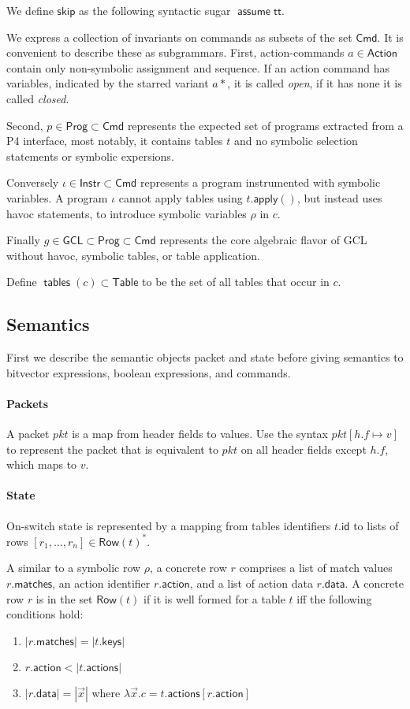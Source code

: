 \documentclass{article}
\newcommand{\pkt}{\mathit{pkt}}
\newcommand{\TRUE}{\mathsf{tt}}
\newcommand{\Cmd}{\mathsf{Cmd}}
\newcommand{\Action}{\mathsf{Action}}
\newcommand{\Instr}{\mathsf{Instr}}
\newcommand{\Prog}{\mathsf{Prog}}
\newcommand{\GCL}{\mathsf{GCL}}
\newcommand{\Table}{\mathsf{Table}}
\newcommand{\Row}{\mathsf{Row}}
\newcommand{\matches}{\mathsf{matches}}
\newcommand{\action}{\mathsf{action}}
\newcommand{\actions}{\mathsf{actions}}
\newcommand{\keys}{\mathsf{keys}}
\newcommand{\data}{\mathsf{data}}
\newcommand{\id}{\mathsf{id}}
\newcommand{\assume}{\mathop{\mathsf{assume}}}
\newcommand{\apply}{\mathsf{apply}}
\newcommand{\SKIP}{\mathsf{skip}}
\newcommand{\tables}{\mathop{\mathsf{tables}}}
\begin{document}
We define $\SKIP$ as the following syntactic sugar $\assume \TRUE$.

We express a collection of invariants on commands as subsets of the set $\Cmd$.
It is convenient to describe these as subgrammars. First, action-commands $a \in
\Action$ contain only non-symbolic assignment and sequence. If an action
command has variables, indicated by the starred variant $a*$, it is called
\emph{open}, if it has none it is called \emph{closed}.

Second, $p \in \Prog \subset \Cmd$ represents the expected set of programs extracted from a
P4 interface, most notably, it contains tables $t$ and no symbolic selection
statements or symbolic expersions.

Conversely $\iota \in \Instr \subset \Cmd$ represents a program instrumented
with symbolic variables. A program $\iota$ cannot apply tables using
$t.\apply()$, but instead uses havoc statements, to
introduce symbolic variables $\rho$ in $c$.

Finally $g \in \GCL \subset \Prog \subset \Cmd$ represents the core algebraic
flavor of GCL without havoc, symbolic tables, or table application.


Define $\tables(c) \subset \Table$ to be the set of all tables that occur in $c$.

\subsection{Semantics}

First we describe the semantic objects packet and state before giving semantics
to bitvector expressions, boolean expressions, and commands.

\paragraph{Packets}
A packet $\pkt$ is a map from header fields to values. Use the syntax $\pkt[h.f
  \mapsto v]$ to represent the packet that is equivalent to $\pkt$ on all header
fields except $h.f$, which maps to $v$.

\paragraph{State}
On-switch state is represented by a mapping from tables identifiers $t.\id$ to
lists of rows $[r_1,\ldots,r_n] \in \Row(t)^*$.

A similar to a symbolic row $\rho$, a concrete row $r$ comprises a list of match
values $r.\matches$, an action identifier $r.\action$, and a list of action data
$r.\data$. A concrete row $r$ is in the set $\Row(t)$ if it is well formed for a
table $t$ iff the following conditions hold:
\begin{enumerate}
\item $|r.\matches| = |t.\keys|$
\item $r.\action < |t.\actions|$
\item $|r.\data| = |\vec x|$ where $\lambda \vec x. c = t.\actions[r.\action]$
\end{enumerate}\
\end{document}
